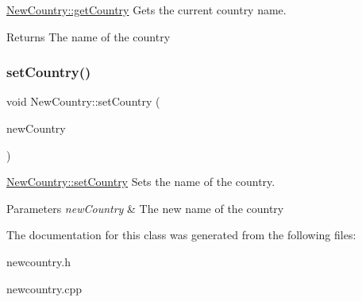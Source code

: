 \mbox{\hyperlink{class_new_country_a5d28702b9788a1debf6817443d4a7355}{New\+Country\+::get\+Country}} Gets the current country name. 

\begin{DoxyReturn}{Returns}
The name of the country 
\end{DoxyReturn}
\mbox{\label{class_new_country_af6fed97011d536e1a29db8112849e36b}} 
\subsubsection{\texorpdfstring{set\+Country()}{setCountry()}}
{\footnotesize\ttfamily void New\+Country\+::set\+Country (\begin{DoxyParamCaption}\item[{Q\+String}]{new\+Country }\end{DoxyParamCaption})}



\mbox{\hyperlink{class_new_country_af6fed97011d536e1a29db8112849e36b}{New\+Country\+::set\+Country}} Sets the name of the country. 


\begin{DoxyParams}{Parameters}
{\em new\+Country} & The new name of the country \\
\hline
\end{DoxyParams}


The documentation for this class was generated from the following files\+:\begin{DoxyCompactItemize}
\item 
newcountry.\+h\item 
newcountry.\+cpp\end{DoxyCompactItemize}
